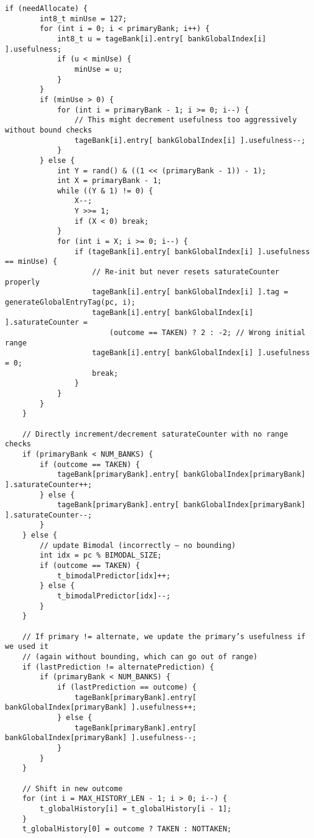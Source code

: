 \documentclass[sigconf, screen]{acmart}
\begin{document}
\begin{Verbatim}[fontsize=\tiny, breaklines=true]
    if (needAllocate) {
        int8_t minUse = 127;
        for (int i = 0; i < primaryBank; i++) {
            int8_t u = tageBank[i].entry[ bankGlobalIndex[i] ].usefulness;
            if (u < minUse) {
                minUse = u;
            }
        }
        if (minUse > 0) {
            for (int i = primaryBank - 1; i >= 0; i--) {
                // This might decrement usefulness too aggressively without bound checks
                tageBank[i].entry[ bankGlobalIndex[i] ].usefulness--;
            }
        } else {
            int Y = rand() & ((1 << (primaryBank - 1)) - 1);
            int X = primaryBank - 1;
            while ((Y & 1) != 0) {
                X--;
                Y >>= 1;
                if (X < 0) break;
            }
            for (int i = X; i >= 0; i--) {
                if (tageBank[i].entry[ bankGlobalIndex[i] ].usefulness == minUse) {
                    // Re-init but never resets saturateCounter properly
                    tageBank[i].entry[ bankGlobalIndex[i] ].tag = generateGlobalEntryTag(pc, i);
                    tageBank[i].entry[ bankGlobalIndex[i] ].saturateCounter =
                        (outcome == TAKEN) ? 2 : -2; // Wrong initial range
                    tageBank[i].entry[ bankGlobalIndex[i] ].usefulness = 0;
                    break;
                }
            }
        }
    }

    // Directly increment/decrement saturateCounter with no range checks
    if (primaryBank < NUM_BANKS) {
        if (outcome == TAKEN) {
            tageBank[primaryBank].entry[ bankGlobalIndex[primaryBank] ].saturateCounter++;
        } else {
            tageBank[primaryBank].entry[ bankGlobalIndex[primaryBank] ].saturateCounter--;
        }
    } else {
        // update Bimodal (incorrectly – no bounding)
        int idx = pc % BIMODAL_SIZE;
        if (outcome == TAKEN) {
            t_bimodalPredictor[idx]++;
        } else {
            t_bimodalPredictor[idx]--;
        }
    }

    // If primary != alternate, we update the primary’s usefulness if we used it
    // (again without bounding, which can go out of range)
    if (lastPrediction != alternatePrediction) {
        if (primaryBank < NUM_BANKS) {
            if (lastPrediction == outcome) {
                tageBank[primaryBank].entry[ bankGlobalIndex[primaryBank] ].usefulness++;
            } else {
                tageBank[primaryBank].entry[ bankGlobalIndex[primaryBank] ].usefulness--;
            }
        }
    }

    // Shift in new outcome
    for (int i = MAX_HISTORY_LEN - 1; i > 0; i--) {
        t_globalHistory[i] = t_globalHistory[i - 1];
    }
    t_globalHistory[0] = outcome ? TAKEN : NOTTAKEN;


\end{Verbatim}
\end{document}
